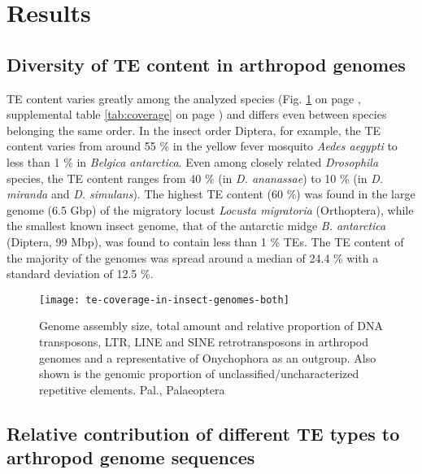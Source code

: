 \section{Results}\label{results}

\subsection{Diversity of TE content in arthropod
genomes}\label{diversity-of-te-content-in-arthropod-genomes}

TE content varies greatly among the analyzed species (Fig.
\ref{fig:te-coverage} on page \pageref{fig:te-coverage}, supplemental
table \ref{tab:coverage} on page \pageref{tab:coverage}) and differs
even between species belonging the same order. In the insect order
Diptera, for example, the TE content varies from around 55 \% in the
yellow fever mosquito \emph{Aedes aegypti} to less than 1 \% in
\emph{Belgica antarctica}. Even among closely related \emph{Drosophila}
species, the TE content ranges from 40 \% (in \emph{D. ananassae}) to 10
\% (in \emph{D. miranda} and \emph{D.  simulans}). The highest TE
content (60 \%) was found in the large genome (6.5 Gbp) of the migratory
locust \emph{Locusta migratoria} (Orthoptera), while the smallest known
insect genome, that of the antarctic midge \emph{B. antarctica}
(Diptera, 99 Mbp), was found to contain less than 1 \% TEs. The TE
content of the majority of the genomes was spread around a median of
24.4 \% with a standard deviation of 12.5 \%.

\begin{figure}[h!]
\begin{center}
\texttt{[image: te-coverage-in-insect-genomes-both]}
\caption{{Genome assembly size, total amount and relative proportion of DNA
transposons, LTR, LINE and SINE retrotransposons in arthropod genomes
and a representative of Onychophora as an outgroup. Also shown is the
genomic proportion of unclassified/uncharacterized repetitive elements.
Pal., Palaeoptera%
}}%
\label{fig:te-coverage}%
\end{center}
\end{figure}

\subsection{Relative contribution of different TE types to arthropod
genome
sequences}\label{relative-contribution-of-different-te-types-to-arthropod-genome-sequences}

